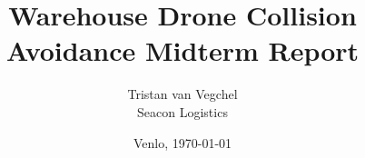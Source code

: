 


\title{Warehouse Drone Collision Avoidance Midterm Report}
\author{Tristan van Vegchel \hfil \\
	Seacon Logistics}
\date{Venlo, \today}

\makenoidxglossaries


\renewcommand{\bibname}{References}



	\pagestyle{fancy}
	\newcommand{\headrulecolor}[1]{\patchcmd{\headrule}{\hrule}{\color{#1}\hrule}{}{}}
	\newcommand{\footrulecolor}[1]{\patchcmd{\footrule}{\hrule}{\color{#1}\hrule}{}{}}
	\pagestyle{fancy}
	\fancyhf{}%
	\fancyhead[C]{}
	\fancyhead[R]{\thepage}
	\setlength{\headsep}{33pt}
	\setlength{\headheight}{13.6pt}
	\renewcommand{\headrulewidth}{0.4pt}
	\maketitle
	\setcounter{page}{2}
	
	
	
	
	
	\tableofcontents
	\listoffigures
	\listoftables
	\glsaddall
	\printnoidxglossary[type=\acronymtype,title=List of Abbreviations]
	\printnoidxglossary[title=Definitions]
	
	\pagebreak
	
	
	
	
	
	
	
	
	
	
	\begin{appendices}
		
		
		
		
	\end{appendices}
